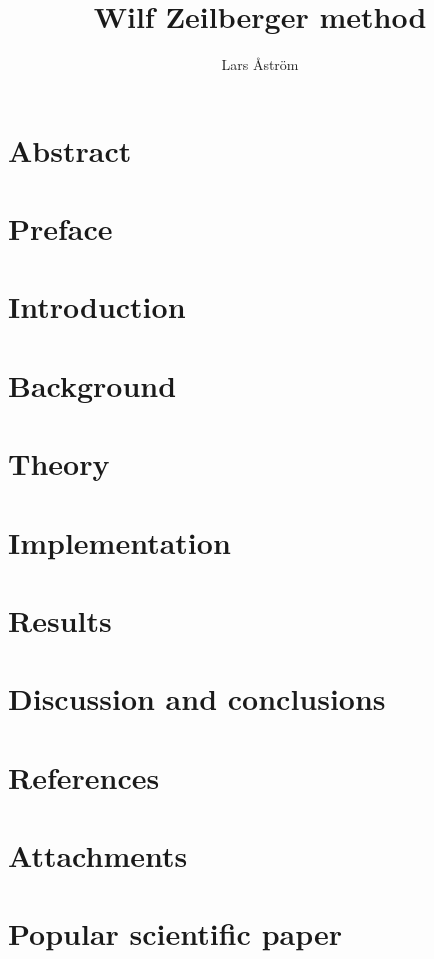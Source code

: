 \documentclass{LTHthesis}
\theoremstyle{definition}
\begin{document}
\begin{titlepages}
\author{Lars Åström}
\title{Wilf Zeilberger method}
\end{titlepages}
\chapter*{Abstract}

\chapter*{Preface}

\tableofcontents

\chapter{Introduction}


\chapter{Background}


\chapter{Theory}


\chapter{Implementation}


\chapter{Results}


\chapter{Discussion and conclusions}


%
\chapter*{References}


\chapter*{Attachments}


\chapter*{Popular scientific paper}

\end{document}
